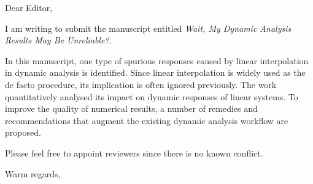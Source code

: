 \documentclass[a4paper,11pt]{letter}
\begin{document}
\onehalfspacing
\begin{letter}{}
\address{1.127, IRIS Adlershof\\Humboldt-Universität zu Berlin\\Berlin, Germany, 12489}

\opening{Dear Editor,}

I am writing to submit the manuscript entitled \textit{Wait, My Dynamic Analysis Results May Be Unreliable?}.

In this manuscript, one type of spurious responses caused by linear interpolation in dynamic analysis is identified. Since linear interpolation is widely used as the de facto procedure, its implication is often ignored previously. The work quantitatively analysed its impact on dynamic responses of linear systems. To improve the quality of numerical results, a number of remedies and recommendations that augment the existing dynamic analysis workflow are proposed.

Please feel free to appoint reviewers since there is no known conflict.

\signature{Theodore Chang}

\closing{Warm regards,}
\end{letter}
\clearpage
\end{document}

